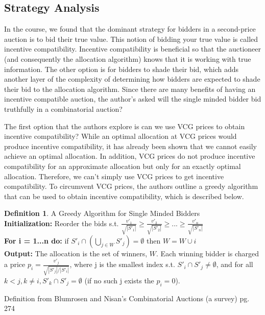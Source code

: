 \documentclass[10pt,onecolumn,letterpaper]{article}
\theoremstyle{definition}
\newtheorem{definition}{Definition}[section]
\begin{document}
\subsection{Strategy Analysis} %

In the course, we found that the dominant strategy for bidders in a second-price auction is to bid their true value. This notion of bidding your true value is called incentive compatibility. Incentive compatibility is beneficial so that the auctioneer (and consequently the allocation algorithm) knows that it is working with true information. The other option is for bidders to shade their bid, which adds another layer of the complexity of determining how bidders are expected to shade their bid to the allocation algorithm. Since there are many benefits of having an incentive compatible auction, the author's asked will the single minded bidder bid truthfully in a combinatorial auction?

The first option that the authors explore is can we use VCG prices to obtain incentive compatibility? While an optimal allocation at VCG prices would produce incentive compatibility, it has already been shown that we cannot easily achieve an optimal allocation. In addition, VCG prices do not produce incentive compatibility for an approximate allocation but only for an exactly optimal allocation. Therefore, we can't simply use VCG prices to get incentive compatibility. To circumvent VCG prices, the authors outline a greedy algorithm that can be used to obtain incentive compatibility, which is described below.

\theoremstyle{definition}
\begin{definition}{A Greedy Algorithm for Single Minded Bidders}
\\
\textbf{Initialization:} Reorder the bids s.t. $\frac{v'_1}{\sqrt{|S'_1|}} \geq \frac{v'_2}{\sqrt{|S'_2|}} \geq ... \geq \frac{v'_n}{\sqrt{|S'_n|}} $
\\
\textbf{For i = 1...n do:} if $S'_i \cap (\bigcup_{j \in W} S'_j) = \emptyset$ then $W = W \cup i$
\\
\textbf{Output:} The allocation is the set of winners, $W$. Each winning bidder is charged a price $p_i = \frac{v'_j}{\sqrt{|S'_j|/|S'_i|}}$, where j is the smallest index s.t. $S'_i \cap S'_j \neq \emptyset$, and for all $k < j, k \neq i, S'_k \cap S'_j = \emptyset$ (if no such j exists the $p_i = 0$).

Definition from Blumrosen and Nisan's Combinatorial Auctions (a survey) pg. 274 \cite{paper}
\end{definition}
\end{document}
